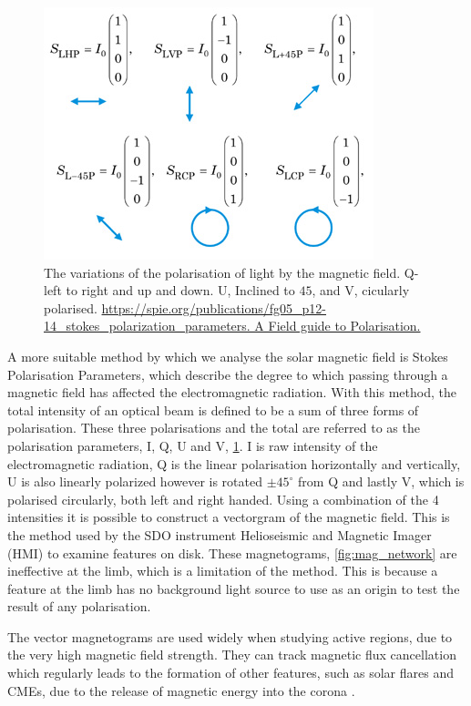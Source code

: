 \begin{figure}
	\centering
	\includegraphics[scale=3.5]{Chapter1/Figs/stokes_params}
	
	\caption{The variations of the polarisation of light by the magnetic field. Q-left to right and up and down. U, Inclined to $45$, and V, cicularly polarised.  
		\url{https://spie.org/publications/fg05_p12-14_stokes_polarization_parameters. A Field guide to Polarisation.}}
	\label{fig:stokes}
\end{figure}

A more suitable method by which we analyse the solar magnetic field is Stokes Polarisation Parameters, which describe the degree to which passing through a magnetic field has affected the electromagnetic radiation.
With this method, the total intensity of an optical beam is defined to be a sum of three forms of polarisation.
These three polarisations and the total are referred to as the polarisation parameters, I, Q, U and V, \cref{fig:stokes}.
I is raw intensity of the electromagnetic radiation, Q is the linear polarisation horizontally and vertically, U is also linearly polarized however is rotated $\pm45^\circ$ from Q and lastly V, which is polarised circularly, both left and right handed.
Using a combination of the 4 intensities it is possible to construct a vectorgram of the magnetic field.
This is the method used by the SDO instrument Helioseismic and Magnetic Imager (HMI) to examine features on disk.
These magnetograms, \cref{fig:mag_network} are ineffective at the limb, which is a limitation of the method.
This is because a feature at the limb has no background light source to use as an origin to test the result of any polarisation. 

The vector magnetograms are used widely when studying active regions, due to the very high magnetic field strength.
They can track magnetic flux cancellation which regularly leads to the formation of other features, such as solar flares and CMEs, due to the release of magnetic energy into the corona \cite{Welsch2006}.

